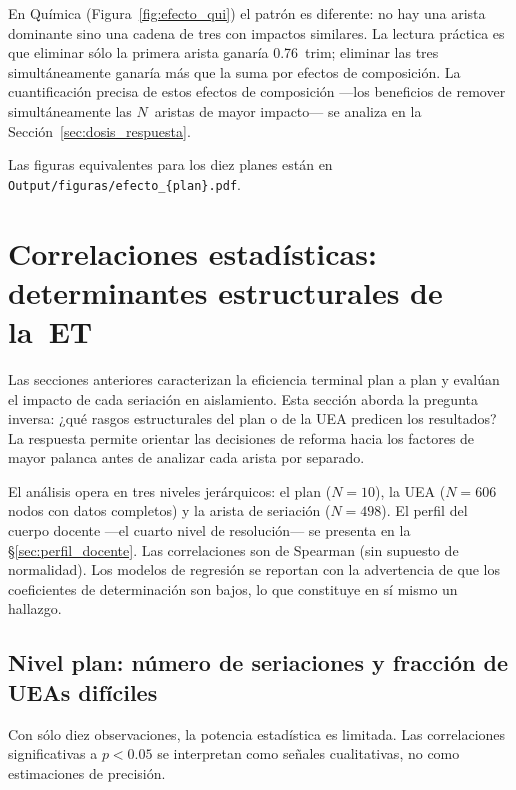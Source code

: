 \documentclass[11pt,letterpaper]{article}
\begin{document}
En Química (Figura~\ref{fig:efecto_qui}) el patrón es diferente: no hay una
arista dominante sino una cadena de tres con impactos similares.
La lectura práctica es que eliminar sólo la primera arista ganaría 0.76~trim;
eliminar las tres simultáneamente ganaría más que la suma por efectos de
composición.
La cuantificación precisa de estos efectos de composición ---los beneficios
de remover simultáneamente las $N$~aristas de mayor impacto--- se analiza
en la Sección~\ref{sec:dosis_respuesta}.

Las figuras equivalentes para los diez planes están en
\texttt{Output/figuras/efecto\_\{plan\}.pdf}.

\section{Correlaciones estadísticas: determinantes estructurales de la~ET}
\label{sec:correlaciones}

Las secciones anteriores caracterizan la eficiencia terminal plan a plan y evalúan el impacto de cada seriación en aislamiento.
Esta sección aborda la pregunta inversa: ¿qué rasgos estructurales del plan o de la UEA predicen los resultados?
La respuesta permite orientar las decisiones de reforma hacia los factores de mayor palanca antes de analizar cada arista por separado.

El análisis opera en tres niveles jerárquicos: el plan ($N=10$), la UEA
($N=606$ nodos con datos completos) y la arista de seriación ($N=498$).
El perfil del cuerpo docente ---el cuarto nivel de resolución--- se presenta en la
\S\ref{sec:perfil_docente}.
Las correlaciones son de Spearman (sin supuesto de normalidad).
Los modelos de regresión se reportan con la advertencia de que los coeficientes
de determinación son bajos, lo que constituye en sí mismo un hallazgo.

\subsection{Nivel plan: número de seriaciones y fracción de UEAs difíciles}

Con sólo diez observaciones, la potencia estadística es limitada.
Las correlaciones significativas a $p<0.05$ se interpretan como señales cualitativas, no como estimaciones de precisión.
\end{document}
